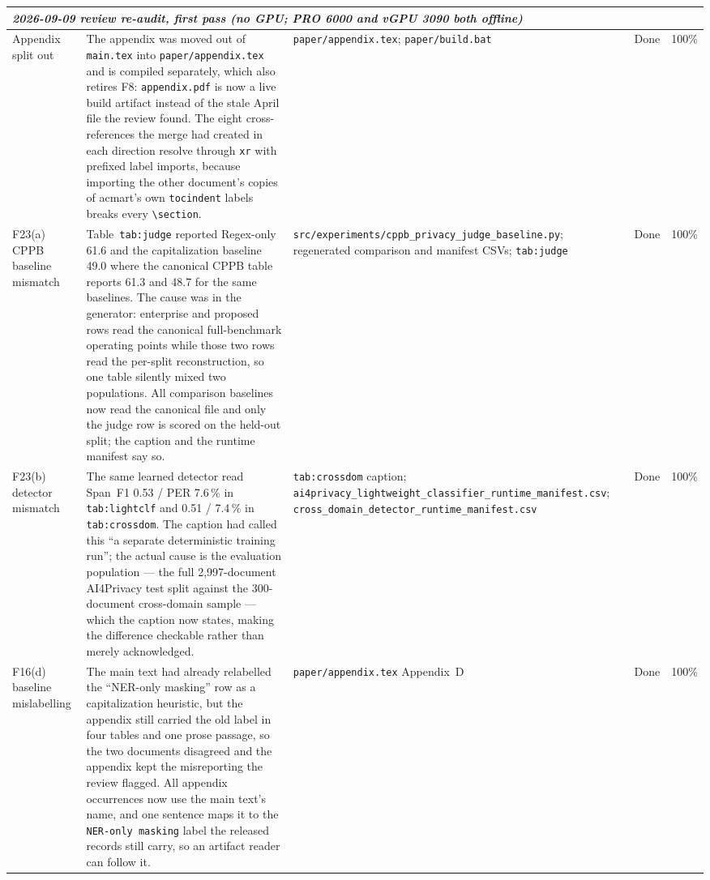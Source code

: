 \documentclass[11pt]{article}
\begin{document}
\begin{longtable}{p{}p{}p{}p{}p{}}
\midrule
\multicolumn{5}{l}{\emph{2026-09-09 review re-audit, first pass (no GPU; PRO 6000 and vGPU 3090 both offline)}} \\
\midrule
Appendix split out & The appendix was moved out of \texttt{main.tex} into \texttt{paper/appendix.tex} and is compiled separately, which also retires F8: \texttt{appendix.pdf} is now a live build artifact instead of the stale April file the review found. The eight cross-references the merge had created in each direction resolve through \texttt{xr} with prefixed label imports, because importing the other document's copies of acmart's own \texttt{tocindent} labels breaks every \texttt{\textbackslash section}. & \texttt{paper/appendix.tex}; \texttt{paper/build.bat} & Done & 100\% \\
F23(a) CPPB baseline mismatch & Table~\texttt{tab:judge} reported Regex-only 61.6 and the capitalization baseline 49.0 where the canonical CPPB table reports 61.3 and 48.7 for the same baselines. The cause was in the generator: enterprise and proposed rows read the canonical full-benchmark operating points while those two rows read the per-split reconstruction, so one table silently mixed two populations. All comparison baselines now read the canonical file and only the judge row is scored on the held-out split; the caption and the runtime manifest say so. & \texttt{src/experiments/cppb\_privacy\_judge\_baseline.py}; regenerated comparison and manifest CSVs; \texttt{tab:judge} & Done & 100\% \\
F23(b) detector mismatch & The same learned detector read Span~F1 0.53 / PER 7.6\,\% in \texttt{tab:lightclf} and 0.51 / 7.4\,\% in \texttt{tab:crossdom}. The caption had called this ``a separate deterministic training run''; the actual cause is the evaluation population --- the full 2{,}997-document AI4Privacy test split against the 300-document cross-domain sample --- which the caption now states, making the difference checkable rather than merely acknowledged. & \texttt{tab:crossdom} caption; \texttt{ai4privacy\_lightweight\_classifier\_runtime\_manifest.csv}; \texttt{cross\_domain\_detector\_runtime\_manifest.csv} & Done & 100\% \\
F16(d) baseline mislabelling & The main text had already relabelled the ``NER-only masking'' row as a capitalization heuristic, but the appendix still carried the old label in four tables and one prose passage, so the two documents disagreed and the appendix kept the misreporting the review flagged. All appendix occurrences now use the main text's name, and one sentence maps it to the \texttt{NER-only masking} label the released records still carry, so an artifact reader can follow it. & \texttt{paper/appendix.tex} Appendix~D & Done & 100\% \\

\end{longtable}
\end{document}
